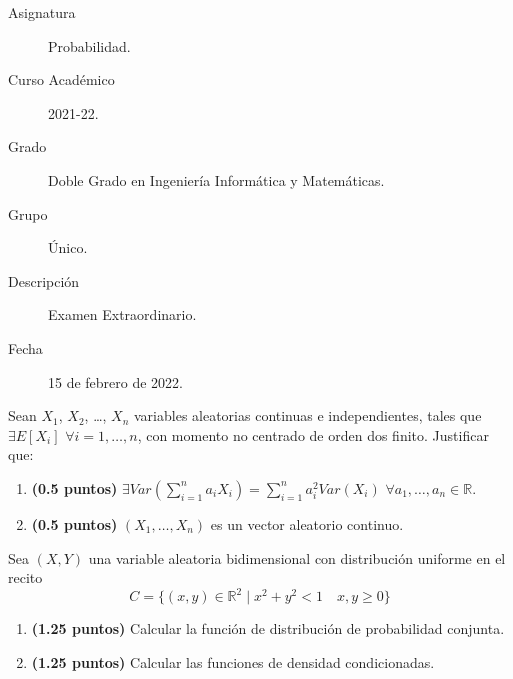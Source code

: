 \documentclass[12pt]{article}
\begin{document}

    
    

    \begin{description}
        \item[Asignatura] Probabilidad.
        \item[Curso Académico] 2021-22.
        \item[Grado] Doble Grado en Ingeniería Informática y Matemáticas.
        \item[Grupo] Único.
        \item[Descripción] Examen Extraordinario. 
        \item[Fecha] 15 de febrero de 2022.
    
    \end{description}
    \newpage

    \begin{ejercicio}
        Sean $X_1$, $X_2$, \ldots, $X_n$ variables aleatorias continuas e independientes, tales que $\exists E[X_i]$ $\forall i=1,\ldots,n$, con momento no centrado de orden dos finito. Justificar que:
        \begin{enumerate}[label=\alph*)]
            \item \textbf{(0.5 puntos)} $\exists Var(\sum_{i=1}^{n}a_iX_i) = \sum_{i=1}^{n}a_i^2 Var(X_i)$ $\forall a_1,\ldots,a_n\in \mathbb{R}$.
            \item \textbf{(0.5 puntos)} $(X_1, \ldots, X_n)$ es un vector aleatorio continuo.
        \end{enumerate}
    \end{ejercicio}

    \begin{ejercicio}
        Sea $(X,Y)$ una variable aleatoria bidimensional con distribución uniforme en el recito
        \begin{equation*}
            C = \{(x,y)\in \mathbb{R}^2 \mid x^2+y^2 < 1 \quad x,y\geq 0\}
        \end{equation*}
        \begin{enumerate}[label=\alph*)]
            \item \textbf{(1.25 puntos)} Calcular la función de distribución de probabilidad conjunta.
            \item \textbf{(1.25 puntos)} Calcular las funciones de densidad condicionadas.
        \end{enumerate}
    \end{ejercicio}
\end{document}
